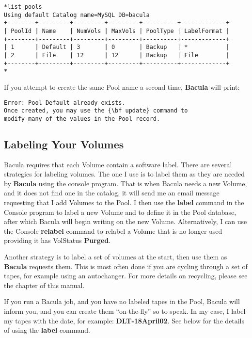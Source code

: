 {{\footnotesize
\begin{verbatim}
*list pools
Using default Catalog name=MySQL DB=bacula
+--------+---------+---------+---------+----------+-------------+
| PoolId | Name    | NumVols | MaxVols | PoolType | LabelFormat |
+--------+---------+---------+---------+----------+-------------+
| 1      | Default | 3       | 0       | Backup   | *           |
| 2      | File    | 12      | 12      | Backup   | File        |
+--------+---------+---------+---------+----------+-------------+
*
\end{verbatim}
\normalsize

If you attempt to create the same Pool name a second time, {\bf Bacula} will
print: 

\footnotesize
\begin{verbatim}
Error: Pool Default already exists.
Once created, you may use the {\bf update} command to
modify many of the values in the Pool record.
\end{verbatim}
\normalsize

\label{Labeling}

\subsection*{Labeling Your Volumes}

Bacula requires that each Volume contain a software label. There are several
strategies for labeling volumes. The one I use is to label them as they are
needed by {\bf Bacula} using the console program. That is when Bacula needs a
new Volume, and it does not find one in the catalog, it will send me an email
message requesting that I add Volumes to the Pool. I then use the {\bf label}
command in the Console program to label a new Volume and to define it in the
Pool database, after which Bacula will begin writing on the new Volume.
Alternatively, I can use the Console {\bf relabel} command to relabel a Volume
that is no longer used providing it has VolStatus {\bf Purged}. 

Another strategy is to label a set of volumes at the start, then use them as
{\bf Bacula} requests them. This is most often done if you are cycling through
a set of tapes, for example using an autochanger. For more details on
recycling, please see the 
 chapter of
this manual. 

If you run a Bacula job, and you have no labeled tapes in the Pool, Bacula
will inform you, and you can create them ``on-the-fly'' so to speak. In my
case, I label my tapes with the date, for example: {\bf DLT-18April02}. See
below for the details of using the {\bf label} command. 

}}
